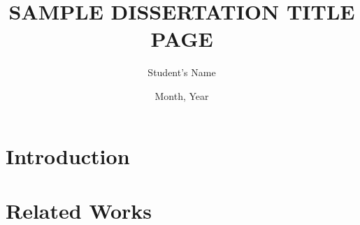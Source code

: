 \documentclass{unophd}
\title{SAMPLE DISSERTATION TITLE PAGE}
\author{Student's Name}
\date{Month, Year}
\begin{document}
\maketitle

\makeabstract

\chapter{Introduction}

\chapter{Related Works}
\end{document}
